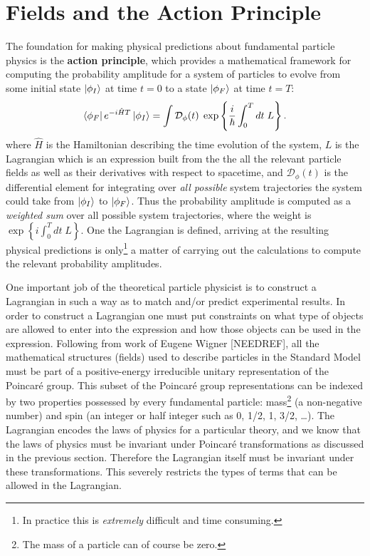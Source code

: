 \section{Fields and the Action Principle}
The foundation for making physical predictions about fundamental particle physics is the \textbf{action principle}, which provides a mathematical framework for computing the probability amplitude for a system of particles to evolve from some initial state $\ket{\phi_I}$ at time $t=0$ to a state $\ket{\phi_F}$ at time $t=T$:
\begin{equation}
    \bra{\phi_F} e^{-i\hat{H}T} \ket{\phi_I} = \int \mathcal{D}_{\phi}(t)\; \exp \left\{ \frac{i}{\hbar} \int_{0}^{T} dt\; L \right\}.
\end{equation}
where $\hat{H}$ is the Hamiltonian describing the time evolution of the system, $L$ is the Lagrangian which is an expression built from the the all the relevant particle fields as well as their derivatives with respect to spacetime, and $\mathcal{D}_{\phi}(t)$ is the differential element for integrating over \textit{all possible} system trajectories the system could take from $\ket{\phi_I}$ to $\ket{\phi_F}$.
Thus the probability amplitude is computed as a \textit{weighted sum} over all possible system trajectories, where the weight is $\exp \left\{ i \int_{0}^{T} dt\; L \right\}$.
One the Lagrangian is defined, arriving at the resulting physical predictions is only\footnote{In practice this is \textit{extremely} difficult and time consuming.} a matter of carrying out the calculations to compute the relevant probability amplitudes.


One important job of the theoretical particle physicist is to construct a Lagrangian in such a way as to match and/or predict experimental results.
In order to construct a Lagrangian one must put constraints on what type of objects are allowed to enter into the expression and how those objects can be used in the expression.
Following from work of Eugene Wigner [NEEDREF], all the mathematical structures (fields) used to describe particles in the Standard Model must be part of a positive-energy irreducible unitary representation of the Poincar\'{e} group.
This subset of the Poincar\'{e} group representations can be indexed by two properties possessed by every fundamental particle: mass\footnote{The mass of a particle can of course be zero.} (a non-negative number) and spin (an integer or half integer such as 0, 1/2, 1, 3/2, \dots).
The Lagrangian encodes the laws of physics for a particular theory, and we know that the laws of physics must be invariant under Poincar\'{e} transformations as discussed in the previous section.
Therefore the Lagrangian itself must be invariant under these transformations.
This severely restricts the types of terms that can be allowed in the Lagrangian.

